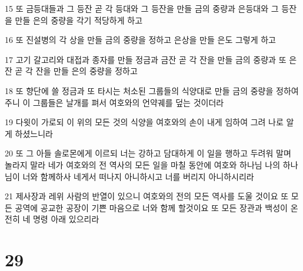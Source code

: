 \par 15 또 금등대들과 그 등잔 곧 각 등대와 그 등잔을 만들 금의 중량과 은등대와 그 등잔을 만들 은의 중량을 각기 적당하게 하고
\par 16 또 진설병의 각 상을 만들 금의 중량을 정하고 은상을 만들 은도 그렇게 하고
\par 17 고기 갈고리와 대접과 종자를 만들 정금과 금잔 곧 각 잔을 만들 금의 중량과 또 은잔 곧 각 잔을 만들 은의 중량을 정하고
\par 18 또 향단에 쓸 정금과 또 타시는 처소된 그룹들의 식양대로 만들 금의 중량을 정하여 주니 이 그룹들은 날개를 펴서 여호와의 언약궤를 덮는 것이더라
\par 19 다윗이 가로되 이 위의 모든 것의 식양을 여호와의 손이 내게 임하여 그려 나로 알게 하셨느니라
\par 20 또 그 아들 솔로몬에게 이르되 너는 강하고 담대하게 이 일을 행하고 두려워 말며 놀라지 말라 네가 여호와의 전 역사의 모든 일을 마칠 동안에 여호와 하나님 나의 하나님이 너와 함께하사 네게서 떠나지 아니하시고 너를 버리지 아니하시리라
\par 21 제사장과 레위 사람의 반열이 있으니 여호와의 전의 모든 역사를 도울 것이요 또 모든 공역에 공교한 공장이 기쁜 마음으로 너와 함께 할것이요 또 모든 장관과 백성이 온전히 네 명령 아래 있으리라

\chapter{29}


